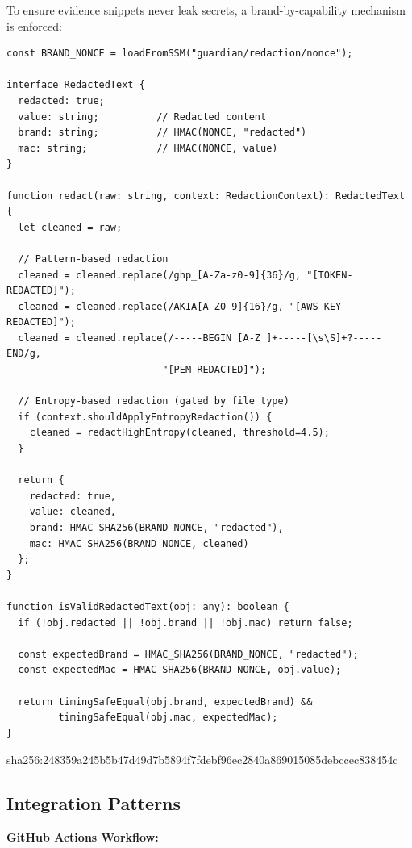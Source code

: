 \documentclass[11pt,a4paper]{article}
\begin{document}
To ensure evidence snippets never leak secrets, a brand-by-capability mechanism is enforced:

\begin{verbatim}
const BRAND_NONCE = loadFromSSM("guardian/redaction/nonce");

interface RedactedText {
  redacted: true;
  value: string;          // Redacted content
  brand: string;          // HMAC(NONCE, "redacted")
  mac: string;            // HMAC(NONCE, value)
}

function redact(raw: string, context: RedactionContext): RedactedText {
  let cleaned = raw;
  
  // Pattern-based redaction
  cleaned = cleaned.replace(/ghp_[A-Za-z0-9]{36}/g, "[TOKEN-REDACTED]");
  cleaned = cleaned.replace(/AKIA[A-Z0-9]{16}/g, "[AWS-KEY-REDACTED]");
  cleaned = cleaned.replace(/-----BEGIN [A-Z ]+-----[\s\S]+?-----END/g, 
                           "[PEM-REDACTED]");
  
  // Entropy-based redaction (gated by file type)
  if (context.shouldApplyEntropyRedaction()) {
    cleaned = redactHighEntropy(cleaned, threshold=4.5);
  }
  
  return {
    redacted: true,
    value: cleaned,
    brand: HMAC_SHA256(BRAND_NONCE, "redacted"),
    mac: HMAC_SHA256(BRAND_NONCE, cleaned)
  };
}

function isValidRedactedText(obj: any): boolean {
  if (!obj.redacted || !obj.brand || !obj.mac) return false;
  
  const expectedBrand = HMAC_SHA256(BRAND_NONCE, "redacted");
  const expectedMac = HMAC_SHA256(BRAND_NONCE, obj.value);
  
  return timingSafeEqual(obj.brand, expectedBrand) &&
         timingSafeEqual(obj.mac, expectedMac);
}
\end{verbatim}

sha256:248359a245b5b47d49d7b5894f7fdebf96ec2840a869015085debccec838454c

\subsection{Integration Patterns}

\textbf{GitHub Actions Workflow:}
\end{document}
